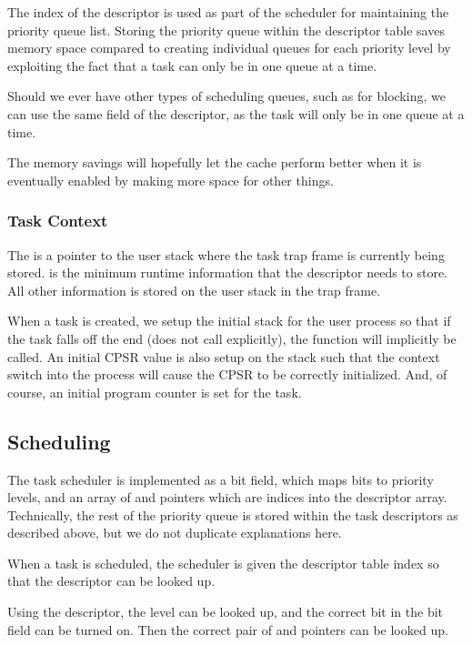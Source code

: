 \documentclass[pdftex,10pt,a4paper]{article}
\begin{document}
The  index of the descriptor is used as part of the
scheduler for maintaining the priority queue list. Storing the
priority queue within the descriptor table saves memory space
compared to creating individual queues for each priority level by
exploiting the fact that a task can only be in one queue at a time.

Should we ever have other types of scheduling queues, such as for
blocking, we can use the same  field of the descriptor, as
the task will only be in one queue at a time.

The memory savings will hopefully let the cache perform better when it
is eventually enabled by making more space for other things.

\subsubsection*{Task Context}

The  is a pointer to the user stack where the task trap frame
is currently being stored.  is the minimum runtime
information that the descriptor needs to store. All other information
is stored on the user stack in the trap frame.

When a task is created, we setup the initial stack for the user
process so that if the task falls off the end (does not call 
explicitly), the  function will implicitly be called. An
initial CPSR value is also setup on the stack such that the context
switch into the process will cause the CPSR to be correctly
initialized. And, of course, an initial program counter is set for the
task.

\subsection*{Scheduling}

The task scheduler is implemented as a bit field, which maps bits to
priority levels, and an array of  and  pointers
which are indices into the descriptor array. Technically, the rest of
the priority queue is stored within the task descriptors as described
above, but we do not duplicate explanations here.

When a task is scheduled, the scheduler is given the descriptor table
index so that the descriptor can be looked up.

Using the descriptor, the  level can be looked up, and
the correct bit in the bit field can be turned on. Then the correct
pair of  and  pointers can be looked up.
\end{document}

